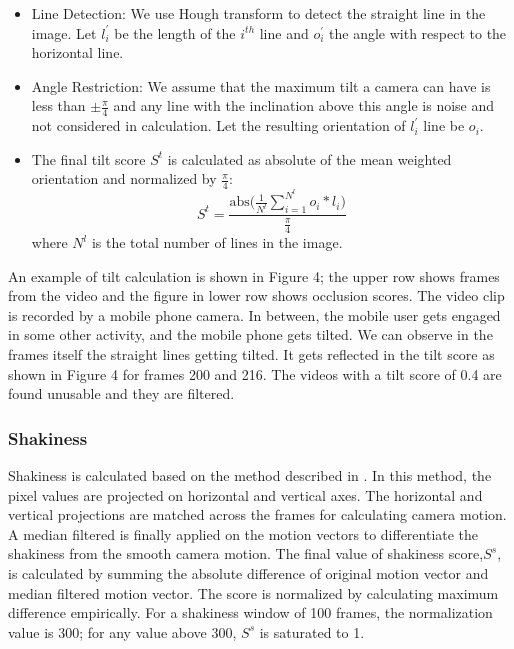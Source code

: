 \documentclass{new}
\begin{document}
\begin{itemize}
    \item Line Detection: We use Hough transform to detect the straight
line in the image. Let {$l_i^'$} be the length of the {$i^{th}$} line and {$o_i^'$} the angle with respect to the horizontal line. 
    \item Angle Restriction: We assume that the maximum tilt a camera
can have is less than {$\pm \frac{\pi}{4}$} and any line with the inclination above this angle is noise and not considered in calculation. Let the resulting orientation of {$l_i^'$} line be {$o_i$}.
    \item The final tilt score {$S^t$} is calculated as absolute of the mean weighted orientation and normalized by {$\frac{\pi}{4}$}:
\begin{equation}
   S^t = \frac{\text{abs($\frac{1}{N^l}$$\sum_{i=1}^{N^l} o_i * l_i$)}}{\frac{\pi}{4}}
\end{equation}
where {$N^l$} is the total number of lines in the image.
\end{itemize}

An example of tilt calculation is shown in  Figure 4; the upper
row shows frames from the video and the figure in lower row shows
occlusion scores. The video clip is recorded by a mobile phone
camera. In between, the mobile user gets engaged in some other
activity, and the mobile phone gets tilted. We can observe in the
frames itself the straight lines getting tilted. It gets reflected in the tilt score as shown in  Figure 4 for frames 200 and 216. The videos with a tilt score of 0.4 are found unusable and they are filtered.

\subsubsection{ Shakiness}
Shakiness is calculated based on the method described in \cite{rfc4}.
In this method, the pixel values are projected on horizontal and
vertical axes. The horizontal and vertical projections are matched
across the frames for calculating camera motion. A median filtered
is finally applied on the motion vectors to differentiate the shakiness
from the smooth camera motion. The final value of shakiness
score,$S^s$, is calculated by summing the absolute difference of original motion vector and median filtered motion vector. The score is
normalized by calculating maximum difference empirically. For a
shakiness window of 100 frames, the normalization value is 300;
for any value above 300, $S^s$ is saturated to 1.
\end{document}
